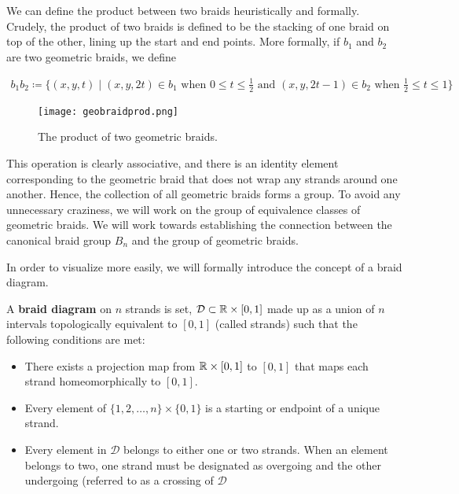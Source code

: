 We can define the product between two braids heuristically and formally. Crudely, the product of two braids is defined to be the stacking of one braid on top of the other, lining up the start and end points. More formally, if $b_1$ and $b_2$ are two geometric braids, we define 

\begin{equation}
\begin{aligned}
	b_1b_2 \coloneq \{(x,y,t)\mid (x,y,2t)\in b_1 \text{ when }0\leq t\leq \frac{1}{2} \text{ and }   (x,y,2t - 1)\in b_2 \text{ when }\frac{1}{2}\leq t\leq 1\}
\end{aligned}
\end{equation}

\begin{figure}[H]
	\centering
	\texttt{[image: geobraidprod.png]}
	\caption{The product of two geometric braids.}
\end{figure}

This operation is clearly associative, and there is an identity element corresponding to the geometric braid that does not wrap any strands around one another. Hence, the collection of all geometric braids forms a group. To avoid any unnecessary craziness, we will work on the group of equivalence classes of geometric braids. We will work towards establishing the connection between the canonical braid group $B_n$ and the group of geometric braids.

In order to visualize more easily, we will formally introduce the concept of a braid diagram.

\begin{definition}
	A \textbf{braid diagram} on $n$ strands is set, $\mathcal{D}\subset \mathbb{R}\times [0,1]$ made up as a union of $n$ intervals topologically equivalent to $[0,1]$ (called strands) such that the following conditions are met:
\begin{itemize}
	\item There exists a projection map from $\mathbb{R}\times [0,1]$ to $[0,1]$ that maps each strand homeomorphically to $[0,1]$.
	\item Every element of $\{1,2,\hdots,n\}\times\{0,1\}$ is a starting or endpoint of a unique strand.
	\item Every element in $\mathcal{D}$ belongs to either one or two strands. When an element belongs to two, one strand must be designated as overgoing and the other undergoing (referred to as a crossing of $\mathcal{D}$
\end{itemize}
\end{definition}

